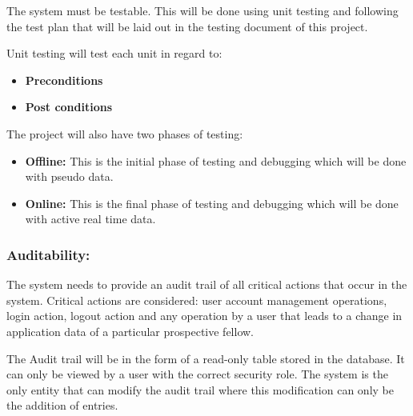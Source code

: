 \documentclass[12pt]{article}
\begin{document}
\begin{flushleft}

The system must be testable. This will be done using unit testing and following the test plan that will be laid out in the testing document of this project.\\

\vspace{0.1in}

Unit testing will test each unit in regard to:
\begin{itemize}

\item\textbf{Preconditions}
\item\textbf{Post conditions}

\end{itemize}

The project will also have two phases of testing:

\begin{itemize}

\item\textbf{Offline:} This is the initial phase of testing and debugging which will be done with pseudo data.
\item\textbf{Online:} This is the final phase of testing and debugging which will be done with active real time data.

\end{itemize}

\end{flushleft}

\vspace{0.1in}

\subsubsection{Auditability:}

\begin{flushleft}

The system needs to provide an audit trail of all critical actions that occur in the system. Critical actions are considered: user account management operations, login action, logout action and any operation by a user that leads to a change in application data of a particular prospective fellow.\\

\vspace{0.1in}

The Audit trail will be in the form of a read-only table stored in the database. It can only be viewed by a user with the correct security role. The system is the only entity that can modify the audit trail where this modification can only be the addition of entries.

\end{flushleft}
\vspace{0.1in}	
\end{document}
